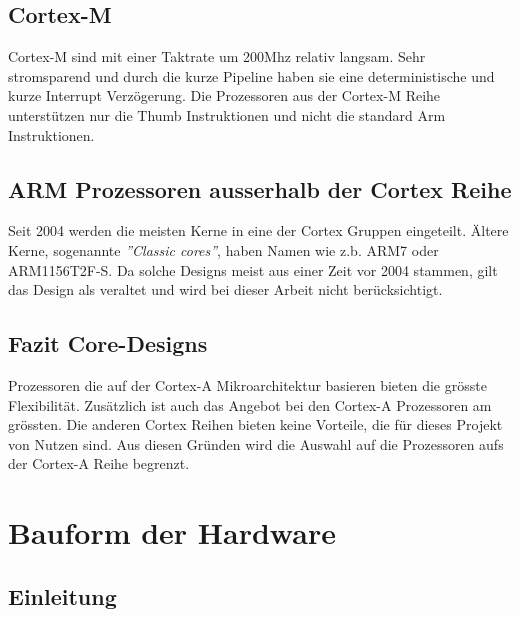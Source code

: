 \subsection{Cortex-M}
Cortex-M sind mit einer Taktrate um 200Mhz relativ langsam.
Sehr stromsparend und durch die kurze Pipeline haben sie eine deterministische und kurze Interrupt Verzögerung.
Die Prozessoren aus der Cortex-M Reihe unterstützen nur die Thumb Instruktionen und nicht die standard Arm Instruktionen.


\subsection{ARM Prozessoren ausserhalb der Cortex Reihe}
Seit 2004 werden die meisten Kerne in eine der Cortex Gruppen eingeteilt.
Ältere Kerne, sogenannte \textit{''Classic cores''}, haben Namen wie z.b. ARM7 oder ARM1156T2F-S.
Da solche Designs meist aus einer Zeit vor 2004 stammen, gilt das Design als veraltet und wird bei dieser Arbeit nicht berücksichtigt.

\subsection{Fazit Core-Designs}
Prozessoren die auf der Cortex-A Mikroarchitektur basieren bieten die grösste Flexibilität.
Zusätzlich ist auch das Angebot bei den Cortex-A Prozessoren am grössten.
Die anderen Cortex Reihen bieten keine Vorteile, die für dieses Projekt von Nutzen sind.
Aus diesen Gründen wird die Auswahl auf die Prozessoren aufs der Cortex-A Reihe begrenzt.

\section{Bauform der Hardware}
\subsection{Einleitung}


